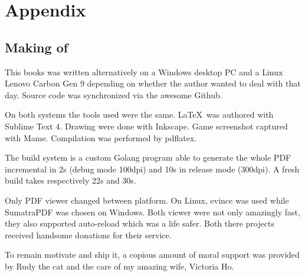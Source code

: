 \chapter{Appendix} 

\section{Making of}

This books was written alternatively on a Windows desktop PC and a Linux Lenovo Carbon Gen 9 depending on whether the author wanted to deal with  that day. Source code was synchronized via the awesome Github.

On both systems the tools used were the same. \LaTeX\ was authored with Sublime Text 4. Drawing were done with Inkscape. Game screenshot captured with Mame. Compilation was performed by pdflatex.

The build system is a custom Golang program able to generate the whole PDF incremental in 2s (debug mode 100dpi) and 10s in release mode (300dpi). A fresh build takes respectively 22s and 30s.

Only PDF viewer changed between platform. On Linux, evince was used while SumatraPDF was chosen on Windows. Both viewer were not only amazingly fast, they also supported auto-reload which was a life safer. Both there projects received handsome donations for their service.

To remain motivate and ship it, a copious amount of moral support was provided by Rudy the cat and the care of my amazing wife, Victoria Ho.
